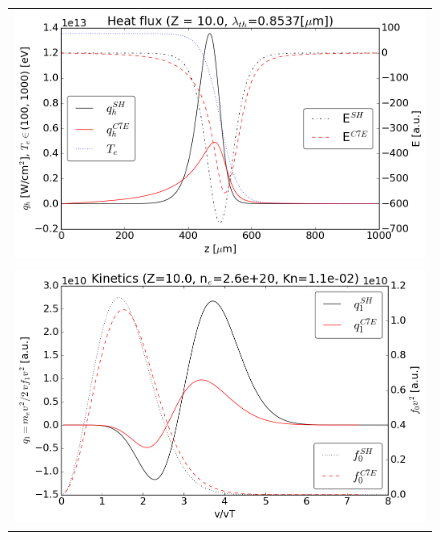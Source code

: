 \documentclass[preprint,12pt]{elsarticle}
\begin{document}
\begin{figure}[tbh]
  \begin{center}
    \begin{tabular}{c}
      \includegraphics[width=1.0\textwidth]{../results/fe_analysis/C7E/P5_heatflux_Z10_Kn1e-2.png} \\ 
      \includegraphics[width=1.0\textwidth]{../results/fe_analysis/C7E/P5_kinetics_Z10_Kn1e-2.png}
    \end{tabular}
  \caption{
  }
  \end{center}
  \label{fig:AWBScorrection_f1}
\end{figure}
\end{document}

